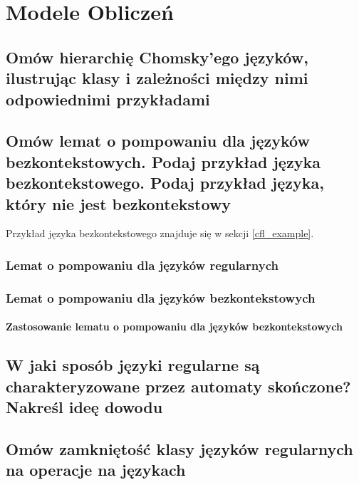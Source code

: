 \chapter{Modele Obliczeń} 

\section{Omów hierarchię Chomsky’ego języków, ilustrując klasy i zależności między
nimi odpowiednimi przykładami}


\section{Omów lemat o pompowaniu dla języków bezkontekstowych. Podaj przykład
języka bezkontekstowego. Podaj przykład języka, który nie jest bezkontekstowy}

Przykład języka bezkontekstowego znajduje się w sekcji \ref{cfl_example}.

\subsection{Lemat o pompowaniu dla języków regularnych}
\label{regular-pumping}


\subsection{Lemat o pompowaniu dla języków bezkontekstowych}


\subsubsection{Zastosowanie lematu o pompowaniu dla języków bezkontekstowych}
\label{context-pumping}


\section{W jaki sposób języki regularne są charakteryzowane przez automaty skończone?
Nakreśl ideę dowodu}


\section{Omów zamkniętość klasy języków regularnych na operacje na językach}


